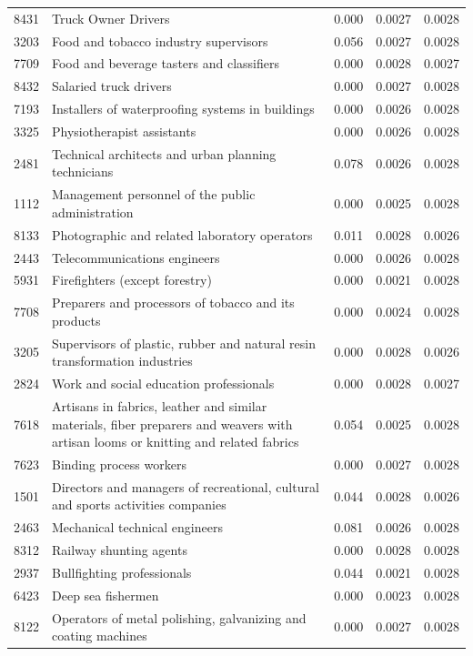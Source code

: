 \begin{longtable}{p{}>{\raggedright\arraybackslash}p{}rrr}
8431 & Truck Owner Drivers & 0.000 & 0.0027 & 0.0028 \\
3203 & Food and tobacco industry supervisors & 0.056 & 0.0027 & 0.0028 \\
7709 & Food and beverage tasters and classifiers & 0.000 & 0.0028 & 0.0027 \\
8432 & Salaried truck drivers & 0.000 & 0.0027 & 0.0028 \\
7193 & Installers of waterproofing systems in buildings & 0.000 & 0.0026 & 0.0028 \\
3325 & Physiotherapist assistants & 0.000 & 0.0026 & 0.0028 \\
2481 & Technical architects and urban planning technicians & 0.078 & 0.0026 & 0.0028 \\
1112 & Management personnel of the public administration & 0.000 & 0.0025 & 0.0028 \\
8133 & Photographic and related laboratory operators & 0.011 & 0.0028 & 0.0026 \\
2443 & Telecommunications engineers & 0.000 & 0.0026 & 0.0028 \\
5931 & Firefighters (except forestry) & 0.000 & 0.0021 & 0.0028 \\
7708 & Preparers and processors of tobacco and its products & 0.000 & 0.0024 & 0.0028 \\
3205 & Supervisors of plastic, rubber and natural resin transformation industries & 0.000 & 0.0028 & 0.0026 \\
2824 & Work and social education professionals & 0.000 & 0.0028 & 0.0027 \\
7618 & Artisans in fabrics, leather and similar materials, fiber preparers and weavers with artisan looms or knitting and related fabrics & 0.054 & 0.0025 & 0.0028 \\
7623 & Binding process workers & 0.000 & 0.0027 & 0.0028 \\
1501 & Directors and managers of recreational, cultural and sports activities companies & 0.044 & 0.0028 & 0.0026 \\
2463 & Mechanical technical engineers & 0.081 & 0.0026 & 0.0028 \\
8312 & Railway shunting agents & 0.000 & 0.0028 & 0.0028 \\
2937 & Bullfighting professionals & 0.044 & 0.0021 & 0.0028 \\
6423 & Deep sea fishermen & 0.000 & 0.0023 & 0.0028 \\
8122 & Operators of metal polishing, galvanizing and coating machines & 0.000 & 0.0027 & 0.0028 \\

\end{longtable}
